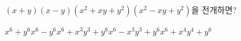 $(x+y)(x-y)(x^2+xy+y^2)(x^2-xy+y^2)$을 전개하면?
\begin{choices32}{$x^6+y^6$}{$x^6-y^6$}{$x^6+x^3y^3+y^6$}{$x^6-x^3y^3+y^6$}{$x^6+x^4y^4+y^6$}\end{choices32}
